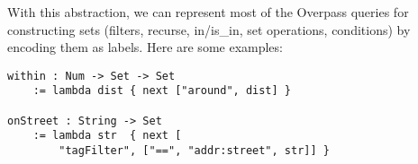 \documentclass[12pt]{extarticle}
\begin{document}
With this abstraction, we can represent most of the Overpass queries for
constructing sets (filters, recurse, in/is_in, set operations, conditions)
by encoding them as labels. Here are some examples:

\begin{lstlisting}
within : Num -> Set -> Set
    := lambda dist { next ["around", dist] }

onStreet : String -> Set
    := lambda str  { next [
        "tagFilter", ["==", "addr:street", str]] }
\end{lstlisting}
\end{document}
